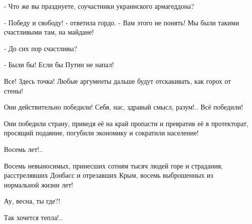 - Что же вы празднуете, соучастники украинского армагеддона?

- Победу и свободу! - ответила гордо. - Вам этого не понять! Мы были такими
счастливыми там, на майдане!

- До сих пор счастливы?

- Были бы! Если бы Путин не напал!

Все! Здесь точка! Любые аргументы дальше будут отскакивать, как горох от стены!

Они действительно победили! Себя, нас, здравый смысл, разум!.. Всё победили!

Они победили страну, приведя её на край пропасти и превратив её в протекторат,
просящий подаяние, погубили экономику и сократили население!

Восемь лет!..

Восемь невыносимых, принесших сотням тысяч людей горе и страдания,
расстрелявших Донбасс и отрезавших Крым, восемь выброшенных из нормальной жизни
лет!

Ау, весна, ты где?!

Так хочется тепла!..


